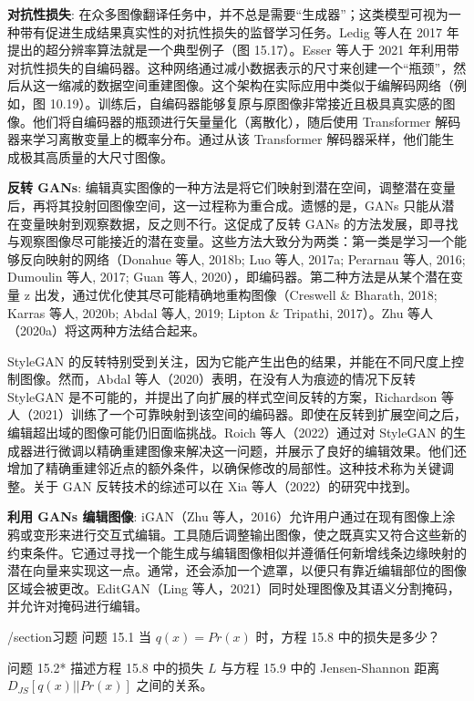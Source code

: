 \textbf{对抗性损失}: 在众多图像翻译任务中，并不总是需要“生成器”；这类模型可视为一种带有促进生成结果真实性的对抗性损失的监督学习任务。Ledig 等人在 2017 年提出的超分辨率算法就是一个典型例子（图 15.17）。Esser 等人于 2021 年利用带对抗性损失的自编码器。这种网络通过减小数据表示的尺寸来创建一个“瓶颈”，然后从这一缩减的数据空间重建图像。这个架构在实际应用中类似于编解码网络（例如，图 10.19）。训练后，自编码器能够复原与原图像非常接近且极具真实感的图像。他们将自编码器的瓶颈进行矢量量化（离散化），随后使用 Transformer 解码器来学习离散变量上的概率分布。通过从该 Transformer 解码器采样，他们能生成极其高质量的大尺寸图像。

\textbf{反转 GANs}: 编辑真实图像的一种方法是将它们映射到潜在空间，调整潜在变量后，再将其投射回图像空间，这一过程称为重合成。遗憾的是，GANs 只能从潜在变量映射到观察数据，反之则不行。这促成了反转 GANs 的方法发展，即寻找与观察图像尽可能接近的潜在变量。这些方法大致分为两类：第一类是学习一个能够反向映射的网络（Donahue 等人, 2018b; Luo 等人, 2017a; Perarnau 等人, 2016; Dumoulin 等人, 2017; Guan 等人, 2020），即编码器。第二种方法是从某个潜在变量 z 出发，通过优化使其尽可能精确地重构图像（Creswell \& Bharath, 2018; Karras 等人, 2020b; Abdal 等人, 2019; Lipton \& Tripathi, 2017）。Zhu 等人（2020a）将这两种方法结合起来。

StyleGAN 的反转特别受到关注，因为它能产生出色的结果，并能在不同尺度上控制图像。然而，Abdal 等人（2020）表明，在没有人为痕迹的情况下反转 StyleGAN 是不可能的，并提出了向扩展的样式空间反转的方案，Richardson 等人（2021）训练了一个可靠映射到该空间的编码器。即使在反转到扩展空间之后，编辑超出域的图像可能仍旧面临挑战。Roich 等人（2022）通过对 StyleGAN 的生成器进行微调以精确重建图像来解决这一问题，并展示了良好的编辑效果。他们还增加了精确重建邻近点的额外条件，以确保修改的局部性。这种技术称为关键调整。关于 GAN 反转技术的综述可以在 Xia 等人（2022）的研究中找到。

\textbf{利用 GANs 编辑图像}: iGAN（Zhu 等人，2016）允许用户通过在现有图像上涂鸦或变形来进行交互式编辑。工具随后调整输出图像，使之既真实又符合这些新的约束条件。它通过寻找一个能生成与编辑图像相似并遵循任何新增线条边缘映射的潜在向量来实现这一点。通常，还会添加一个遮罩，以便只有靠近编辑部位的图像区域会被更改。EditGAN（Ling 等人，2021）同时处理图像及其语义分割掩码，并允许对掩码进行编辑。

/section{习题}
问题 15.1 当 \(q(x) = Pr(x)\) 时，方程 15.8 中的损失是多少？

问题 15.2* 描述方程 15.8 中的损失 \(L\) 与方程 15.9 中的 Jensen-Shannon 距离 \(D_{JS}[q(x) || Pr(x)]\) 之间的关系。

